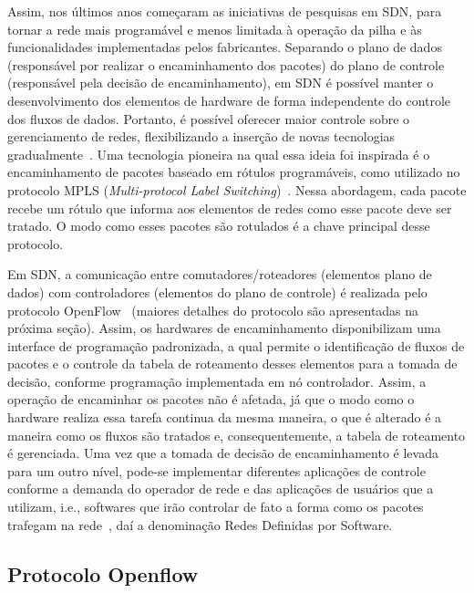 \documentclass[	12pt, Times, openright, twoside, a4paper, english, brazil]{abntex2}
\begin{document}
Assim, nos últimos anos começaram as iniciativas de pesquisas em SDN, para tornar a rede mais programável e menos limitada à operação da pilha e às funcionalidades implementadas pelos fabricantes. Separando o plano de dados (responsável por realizar o encaminhamento dos pacotes) do plano de controle (responsável pela decisão de encaminhamento), em SDN é possível manter o desenvolvimento dos elementos de hardware de forma  independente do controle dos fluxos de dados. Portanto, é possível oferecer maior controle sobre o gerenciamento de redes, flexibilizando a inserção de novas tecnologias gradualmente~\cite{guedes2012}. Uma tecnologia pioneira na qual essa ideia foi inspirada é o encaminhamento de pacotes baseado em rótulos programáveis, como utilizado no protocolo MPLS (\textit{Multi-protocol Label Switching})~\cite{rfc3031}. Nessa abordagem, cada pacote recebe um rótulo que informa aos elementos de redes como esse pacote deve ser tratado. O modo como esses pacotes são rotulados é a chave principal desse protocolo. 

Em SDN, a comunicação entre comutadores/roteadores (elementos plano de dados) com controladores (elementos do plano de controle) é realizada pelo protocolo OpenFlow~\cite{McKeown} (maiores detalhes do protocolo são apresentadas na próxima seção). Assim, os hardwares de encaminhamento disponibilizam uma interface de programação padronizada, a qual permite o identificação de fluxos de pacotes e o controle da tabela de roteamento desses elementos para a tomada de decisão, conforme programação implementada em nó controlador. Assim, a operação de encaminhar os pacotes não é afetada, já que o modo como o hardware realiza essa tarefa continua da mesma maneira, o que é alterado é a maneira como os fluxos são tratados e, consequentemente, a tabela de roteamento é gerenciada. Uma vez que a tomada de decisão de encaminhamento é levada para um outro nível, pode-se implementar diferentes aplicações de controle conforme a demanda do operador de rede e das aplicações de usuários que a utilizam, i.e., softwares que irão controlar de fato a forma como os pacotes trafegam na rede~\cite{guedes2012}, daí a denominação Redes Definidas por Software.

\subsection{Protocolo Openflow}

\end{document}
